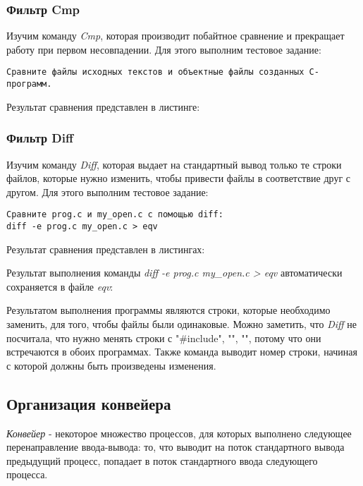 \documentclass[14pt,a4paper,report]{report}
\begin{document}
\subsubsection{Фильтр Cmp}

Изучим команду \emph{Cmp}, которая производит побайтное сравнение и прекращает работу при первом несовпадении. Для этого выполним тестовое задание:

\begin{verbatim}
Сравните файлы исходных текстов и объектные файлы созданных С-программ.
\end{verbatim}

Результат сравнения представлен в листинге:



\subsubsection{Фильтр Diff}

Изучим команду \emph{Diff}, которая выдает на стандартный вывод только те строки файлов, которые нужно изменить, чтобы привести файлы в соответствие друг с другом. Для этого выполним тестовое задание:

\begin{verbatim}
Сравните prog.c и my_open.c с помощью diff:
diff -e prog.c my_open.c > eqv
\end{verbatim}

Результат сравнения представлен в листингах:



Результат выполнения команды \emph{diff -e prog.c my\_open.c > eqv} автоматически сохраняется в файле \emph{eqv}:



Результатом выполнения программы являются строки, которые необходимо заменить, для того, чтобы файлы были одинаковые. Можно заметить, что \emph{Diff} не посчитала, что нужно менять строки с "\#include", "{", "}", потому что они встречаются в обоих программах. Также команда выводит номер строки, начиная с которой должны быть произведены изменения.

\subsection{Организация конвейера}

\emph{Конвейер} - некоторое множество процессов, для которых выполнено следующее перенаправление ввода-вывода: то, что выводит на поток стандартного вывода предыдущий процесс, попадает в поток стандартного ввода следующего процесса.
\end{document}
